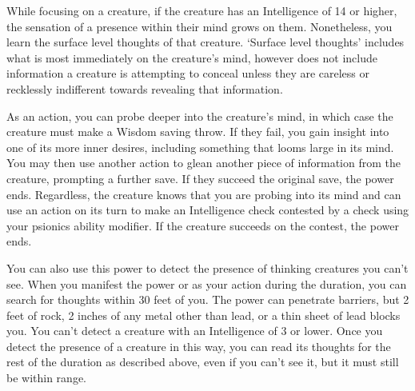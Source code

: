 While focusing on a creature,
if the creature has an Intelligence of 14 or higher,
the sensation of a presence within their mind grows on them.
Nonetheless,
you learn the surface level thoughts of that creature.
`Surface level thoughts' includes what is most
immediately on the creature's mind,
however does not include information a creature is attempting to conceal
unless they are careless or recklessly indifferent
towards revealing that information.

As an action,
you can probe deeper into the creature's mind,
in which case the creature must make a Wisdom saving throw.
If they fail,
you gain insight into one of its more inner desires,
including something that looms large in its mind.
You may then use another action to glean another piece of information
from the creature, prompting a further save.
If they succeed the original save, the power ends.
Regardless,
the creature knows that you are probing into its mind
and can use an action on its turn to make an Intelligence check
contested by a check using your psionics ability modifier.
If the creature succeeds on the contest,
the power ends.

You can also use this power to detect the presence of thinking creatures
you can't see.
When you manifest the power or as your action during the duration,
you can search for thoughts within 30 feet of you.
The power can penetrate barriers,
but 2 feet of rock, 2 inches of any metal other than lead,
or a thin sheet of lead blocks you.
You can't detect a creature with an Intelligence of 3 or lower.
Once you detect the presence of a creature in this way,
you can read its thoughts for the rest of the duration as described above,
even if you can't see it, but it must still be within range.

